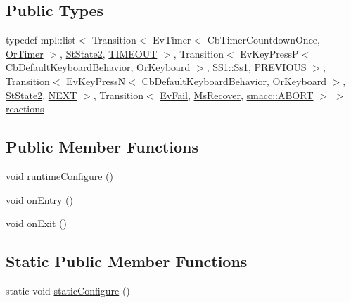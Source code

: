\subsection*{Public Types}
\begin{DoxyCompactItemize}
\item 
typedef mpl\+::list$<$ Transition$<$ Ev\+Timer$<$ Cb\+Timer\+Countdown\+Once, \hyperlink{classsm__three__some_1_1OrTimer}{Or\+Timer} $>$, \hyperlink{structsm__three__some_1_1StState2}{St\+State2}, \hyperlink{structsm__three__some_1_1StState1_1_1TIMEOUT}{T\+I\+M\+E\+O\+UT} $>$, Transition$<$ Ev\+Key\+PressP$<$ Cb\+Default\+Keyboard\+Behavior, \hyperlink{classsm__three__some_1_1OrKeyboard}{Or\+Keyboard} $>$, \hyperlink{structsm__three__some_1_1SS1_1_1Ss1}{S\+S1\+::\+Ss1}, \hyperlink{structsm__three__some_1_1StState1_1_1PREVIOUS}{P\+R\+E\+V\+I\+O\+US} $>$, Transition$<$ Ev\+Key\+PressN$<$ Cb\+Default\+Keyboard\+Behavior, \hyperlink{classsm__three__some_1_1OrKeyboard}{Or\+Keyboard} $>$, \hyperlink{structsm__three__some_1_1StState2}{St\+State2}, \hyperlink{structsm__three__some_1_1StState1_1_1NEXT}{N\+E\+XT} $>$, Transition$<$ \hyperlink{structsm__three__some_1_1EvFail}{Ev\+Fail}, \hyperlink{classsm__three__some_1_1MsRecover}{Ms\+Recover}, \hyperlink{structsmacc_1_1default__transition__tags_1_1ABORT}{smacc\+::\+A\+B\+O\+RT} $>$ $>$ \hyperlink{structsm__three__some_1_1StState1_a5c84a8c68b8a4c0d513c5c935cd85f5d}{reactions}
\end{DoxyCompactItemize}
\subsection*{Public Member Functions}
\begin{DoxyCompactItemize}
\item 
void \hyperlink{structsm__three__some_1_1StState1_a639f34c03fad8014a4e7f7e93d590f27}{runtime\+Configure} ()
\item 
void \hyperlink{structsm__three__some_1_1StState1_addcf92fec018b57c6740acdd4ad0c05e}{on\+Entry} ()
\item 
void \hyperlink{structsm__three__some_1_1StState1_ae8b81c81aaf4ed4e061b8b5b88c8954b}{on\+Exit} ()
\end{DoxyCompactItemize}
\subsection*{Static Public Member Functions}
\begin{DoxyCompactItemize}
\item 
static void \hyperlink{structsm__three__some_1_1StState1_a5e4e25f1cad9ec8be2d03e7d70aeaa88}{static\+Configure} ()
\end{DoxyCompactItemize}
